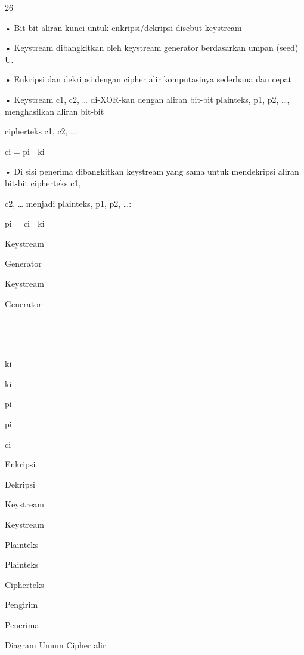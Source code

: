 \documentclass{article}
\begin{document}

26

• Bit-bit aliran kunci untuk enkripsi/dekripsi disebut keystream

• Keystream dibangkitkan oleh keystream generator berdasarkan umpan (seed) U.

• Enkripsi dan dekripsi dengan cipher alir komputasinya sederhana dan cepat 

• Keystream c1, c2, … di-XOR-kan dengan aliran bit-bit plainteks, p1, p2, …, menghasilkan aliran bit-bit 

cipherteks c1, c2, …:



ci = pi  ki 

• Di sisi penerima dibangkitkan keystream yang sama untuk mendekripsi aliran bit-bit cipherteks c1, 

c2, … menjadi plainteks, p1, p2, …:



pi = ci  ki 

Keystream

Generator

Keystream

Generator





ki

ki

pi

pi

ci

Enkripsi

Dekripsi

Keystream

Keystream

Plainteks

Plainteks

Cipherteks

Pengirim

Penerima

Diagram Umum Cipher alir
\end{document}
